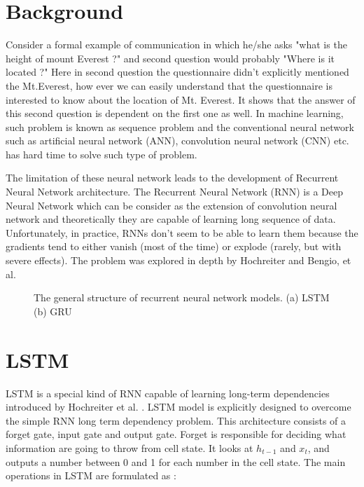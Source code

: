 \section{Background}
Consider a formal example of communication in which he/she asks "what is the height of mount Everest ?" and second question would probably "Where is it located ?" Here in second question the questionnaire didn't explicitly mentioned the Mt.Everest, how ever we can easily understand that the questionnaire is interested to know about the location of Mt. Everest. It shows that the answer of this second question is dependent on the first one as well. In machine learning, such problem is known as sequence problem and the conventional neural network such as artificial neural network (ANN), convolution neural network (CNN) etc. has hard time to solve such type of problem.  


The limitation of these neural network leads to the development of Recurrent Neural Network architecture. The Recurrent Neural Network (RNN) is a Deep Neural Network which can be consider as the extension of convolution neural network \cite{chung2014empirical} and theoretically they are capable of learning long sequence of data. Unfortunately, in practice, RNNs don’t seem to be able to learn them because the gradients tend to either vanish (most of the time) or
explode (rarely, but with severe effects). The problem was explored in depth by Hochreiter\cite{hochreiter} and Bengio, et al.\cite{Bengio_2013}


\begin{figure}[h]
	\centering
	\caption{The general structure of recurrent	neural network models. (a) LSTM (b) GRU }
	\label{fig:foobar}
\end{figure}


\section{LSTM}
LSTM is a special kind of RNN capable of learning long-term dependencies introduced by Hochreiter et al. \cite{hochreiter}. LSTM model is explicitly designed to overcome the simple RNN long term dependency problem. This architecture consists of a forget gate, input gate and output gate. Forget is responsible for deciding what information are going to throw from cell state. It looks at $h_{t-1}$ and $x_t$, and outputs a number between 0 and 1 for each number in the cell state. The main operations in LSTM are formulated as \cite{shahi2020stock}:

